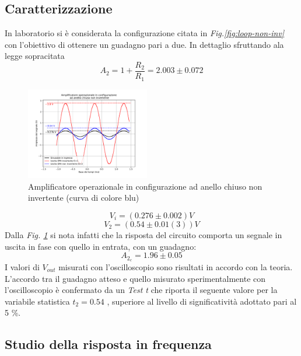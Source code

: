 \documentclass[journal]{IEEEtran}
\begin{document}
\subsection{\textbf{Caratterizzazione}}
In laboratorio si è considerata la configurazione citata in \textit{Fig.\ref{fig:loop-non-inv}} con l'obiettivo di ottenere un guadagno pari a due.
In dettaglio sfruttando ala legge sopracitata
\[A_2 = 1 + \frac{R_2}{R_1} =2.003 \pm 0.072\]
\begin{figure}[H]%
\begin {center}
\includegraphics[width=0.48\textwidth]{analysis/output/OPA-closed-loop-non-inv-G2-11.pdf}
\caption{Amplificatore operazionale in configurazione ad anello chiuso non invertente (curva di colore blu)}
\label{fig:g2-11}
\end {center}
\end{figure}
\[V_i = (0.276 \pm 0.002) V\]
\[V_2 = (0.54 \pm 0.01(3)) V\]
Dalla \textit{Fig. \ref{fig:g2-11}} si nota infatti che la risposta del circuito comporta un segnale in uscita in fase con quello in entrata, con un guadagno:
\[A_{2_c} = 1.96 \pm 0.05\]
I valori di $V_{out}$ misurati con l'oscilloscopio sono risultati in accordo con la teoria.
L'accordo tra il guadagno atteso e quello misurato sperimentalmente con l'oscilloscopio è confermato da un \textit{Test t} che riporta il seguente valore per la variabile statistica $t_2 = 0.54$ , superiore al livello di significatività adottato pari al 5 \%.
\subsection{Studio della risposta in frequenza}
\end{document}
